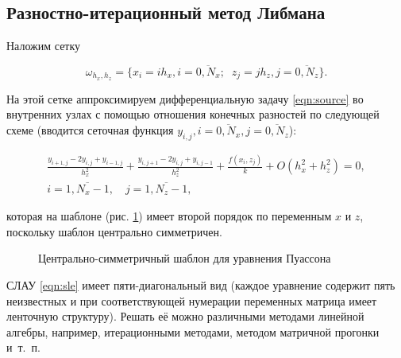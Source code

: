 \documentclass[12pt, a4paper]{article}
\begin{document}
\subsection{Разностно-итерационный метод Либмана}

Наложим сетку

\begin{equation}
	\omega_{h_x, h_z} = \{x_i = ih_x, i = \overline{0,N_x}; \;\; z_j = jh_z, j = \overline{0, N_z}\}.
\end{equation}

На этой сетке аппроксимируем дифференциальную задачу \eqref{eqn:source} во внутренних узлах с помощью отношения конечных разностей по следующей схеме (вводится сеточная функция $y_{i, j}, i = \overline{0, N_x}, j = \overline{0, N_z}$):

\begin{equation}
	\label{eqn:sle}
	\begin{gathered}
		\frac{y_{i+1, j} - 2y_{i,j} + y_{i-1, j}}{h_x^2} + \frac{y_{i, j+1} - 2y_{i,j} + y_{i, j-1}}{h_z^2} + \frac{f(x_i, z_j)}{k} + O(h_x^2 + h_z^2) = 0, \\
		i=\overline{1, N_x - 1}, \quad j = \overline{1, N_z - 1},
	\end{gathered}
\end{equation}

\noindent которая на шаблоне (рис. \ref{img:template}) имеет второй порядок по переменным $x$ и $z$, поскольку шаблон центрально симметричен.

\begin{figure}[ht]
	\centering
	\caption{Центрально-симметричный шаблон для уравнения Пуассона}
	\label{img:template}
\end{figure}

СЛАУ \eqref{eqn:sle} имеет пяти-диагональный вид (каждое уравнение содержит пять неизвестных и при соответствующей нумерации переменных матрица имеет ленточную структуру).
Решать её можно различными методами линейной алгебры, например, итерационными методами, методом матричной прогонки и~т.~п.
\end{document}
